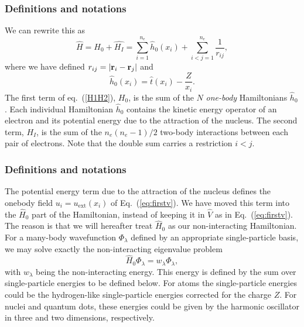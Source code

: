 \frame
{
  \frametitle{Definitions and notations}
\begin{small}
{\scriptsize
 We can rewrite this as
\begin{equation}
    \hat{H} = \hat{H_0} + \hat{H_I} 
    = \sum_{i=1}^{n_e}\hat{h}_0(x_i) + \sum_{i<j=1}^{n_e}\frac{1}{r_{ij}},
\label{H1H2}
\end{equation}
where  we have defined $r_{ij}=| {\bf r}_i-{\bf r}_j|$ and
\begin{equation}
  \hat{h}_0(x_i) =  \hat{t}(x_i) - \frac{Z}{x_i}.
\label{hi}
\end{equation}
The first term of eq.~(\ref{H1H2}), $H_0$, is the sum of the $N$
\emph{one-body} Hamiltonians $\hat{h}_0$. Each individual
Hamiltonian $\hat{h}_0$ contains the kinetic energy operator of an
electron and its potential energy due to the attraction of the
nucleus. The second term, $H_I$, is the sum of the $n_e(n_e-1)/2$
two-body interactions between each pair of electrons. Note that the double sum carries a restriction $i<j$.
}
\end{small}
}

\frame
{
  \frametitle{Definitions and notations}
\begin{small}
{\scriptsize
The potential energy term due to the attraction of the nucleus defines the onebody field $u_i=u_{\mathrm{ext}}(x_i)$ of Eq.~(\ref{eq:firstv}).
We have moved this term into the $\hat{H}_0$ part of the Hamiltonian, instead of keeping  it in $\hat{V}$ as in  Eq.~(\ref{eq:firstv}).
The reason is that we will hereafter treat $\hat{H}_0$ as our non-interacting  Hamiltonian. For a many-body wavefunction $\Phi_{\lambda}$ defined by an  
appropriate single-particle basis, we may solve exactly the non-interacting eigenvalue problem 
\[
\hat{H}_0\Phi_{\lambda}= w_{\lambda}\Phi_{\lambda},
\]
with $w_{\lambda}$ being the non-interacting energy. This energy is defined by the sum over single-particle energies to be defined below.
For atoms the single-particle energies could be the hydrogen-like single-particle energies corrected for the charge $Z$. For nuclei and quantum
dots, these energies could be given by the harmonic oscillator in three and two dimensions, respectively.
}
\end{small}
}

